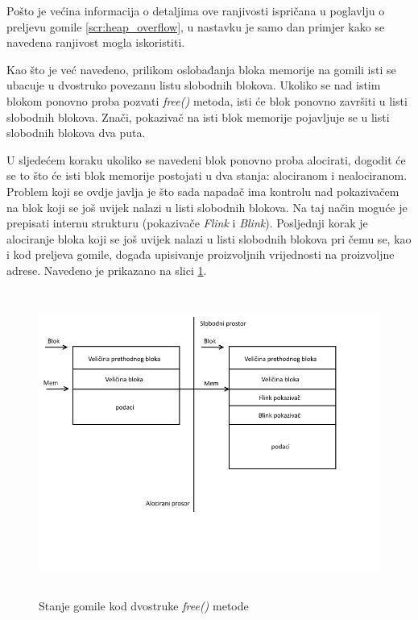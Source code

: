\documentclass[times, utf8, diplomski, numeric]{fer}
\begin{document}
Pošto je većina informacija o detaljima ove ranjivosti ispričana
u poglavlju o preljevu gomile \ref{scr:heap_overflow}, u nastavku
je samo dan primjer kako se navedena ranjivost mogla iskoristiti.

Kao što je već navedeno, prilikom oslobađanja bloka memorije na
gomili isti se ubacuje u dvostruko povezanu listu slobodnih
blokova. Ukoliko se nad istim blokom ponovno proba pozvati
\emph{free()} metoda, isti će blok ponovno završiti u listi
slobodnih blokova. Znači, pokazivač na isti blok memorije
pojavljuje se u listi slobodnih blokova dva puta.

U sljedećem koraku ukoliko se navedeni blok ponovno proba
alocirati, dogodit će se to što će isti blok memorije postojati
u dva stanja: alociranom i nealociranom. Problem koji se ovdje
javlja je što sada napadač ima kontrolu nad pokazivačem na blok
koji se još uvijek nalazi u listi slobodnih blokova. Na taj način
moguće je prepisati internu strukturu (pokazivače \emph{Flink} i
\emph{Blink}). Posljednji korak je alociranje bloka koji se još
uvijek nalazi u listi slobodnih blokova pri čemu se, kao i kod
preljeva gomile, događa upisivanje proizvoljnih vrijednosti na
proizvoljne adrese. Navedeno je prikazano na slici 
\ref{fig:double_free}.

\begin{figure}[!ht]
\centering
\setlength\fboxsep{0pt}
\setlength\fboxrule{0.5pt}
\includegraphics[width=15cm, height=10cm]{slike/double_free}
\caption{Stanje gomile kod dvostruke \emph{free()} metode}
\label{fig:double_free} 
\end{figure}
\end{document}
